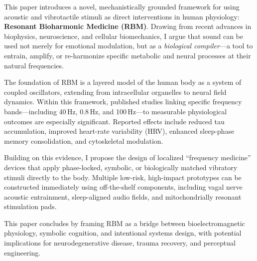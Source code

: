 This paper introduces a novel, mechanistically grounded framework for using acoustic and vibrotactile stimuli as direct interventions in human physiology: \textbf{Resonant Bioharmonic Medicine (RBM)}. Drawing from recent advances in biophysics, neuroscience, and cellular biomechanics, I argue that sound can be used not merely for emotional modulation, but as a \emph{biological compiler}---a tool to entrain, amplify, or re-harmonize specific metabolic and neural processes at their natural frequencies.

The foundation of RBM is a layered model of the human body as a system of coupled oscillators, extending from intracellular organelles to neural field dynamics. Within this framework, published studies linking specific frequency bands---including 40\,Hz, 0.8\,Hz, and 100\,Hz---to measurable physiological outcomes are especially significant. Reported effects include reduced tau accumulation, improved heart-rate variability (HRV), enhanced sleep-phase memory consolidation, and cytoskeletal modulation.

Building on this evidence, I propose the design of localized ``frequency medicine'' devices that apply phase-locked, symbolic, or biologically matched vibratory stimuli directly to the body. Multiple low-risk, high-impact prototypes can be constructed immediately using off-the-shelf components, including vagal nerve acoustic entrainment, sleep-aligned audio fields, and mitochondrially resonant stimulation pads.

This paper concludes by framing RBM as a bridge between bioelectromagnetic physiology, symbolic cognition, and intentional systems design, with potential implications for neurodegenerative disease, trauma recovery, and perceptual engineering.
